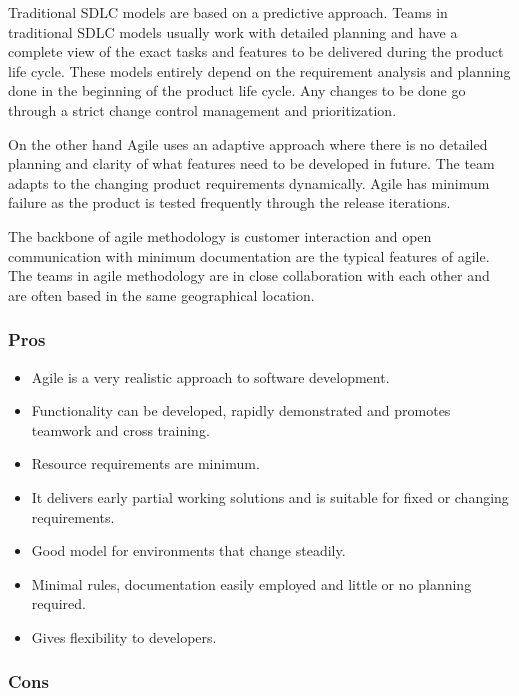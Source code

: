 Traditional SDLC models are based on a predictive approach. Teams in traditional SDLC models 
usually work with detailed planning and have a complete view of the exact tasks and features 
to be delivered during the product life cycle. These models entirely depend on the requirement 
analysis and planning done in the beginning of the product life cycle. Any changes to be done go 
through a strict change control management and prioritization.~\cite{agile}

On the other hand Agile uses an adaptive approach where there is no detailed planning and clarity
of what features need to be developed in future. The team adapts to the  changing product requirements 
dynamically. Agile has minimum failure as the product is tested frequently through the release iterations.

The backbone of agile methodology is customer interaction  and open communication with minimum 
documentation are the typical features of agile. The teams in agile methodology are in close collaboration 
with each other and are often based in the same geographical location.

\subsubsection{Pros}

\begin{itemize}
    \item Agile is a very realistic approach to software development.
    \item Functionality can be developed, rapidly demonstrated and promotes teamwork and cross training. 
    \item Resource requirements are minimum.
    \item It delivers early partial working solutions and is suitable for fixed or changing requirements.
    \item Good model for environments that change steadily.
    \item Minimal rules, documentation easily employed and little or no planning required.
    \item Gives flexibility to developers.
\end{itemize}

\subsubsection{Cons}


